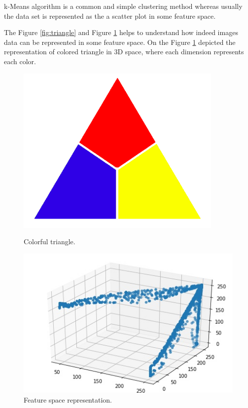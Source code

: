 k-Means algorithm is a common and simple clustering method whereas usually the data set is represented as the a scatter plot in some feature space.

The Figure \ref{fig:triangle} and Figure \ref{fig:clustering} helps to understand how indeed images data can be represented in some feature space. On the Figure  \ref{fig:clustering} depicted the representation of colored triangle in 3D space, where each dimension represents each color.

\begin{figure}[h]
    \centering
    \begin{minipage}[b]{0.4\textwidth}
    \includegraphics[width=\textwidth]{images/k_mean_triangle.png}
    \caption{Colorful triangle.}
    \label{fig:triangle}
    \end{minipage}
    \hfill
    \begin{minipage}[b]{0.4\textwidth}
    \includegraphics[width=\textwidth]{images/k_mean_triangle_clustered.jpg}
    \caption{Feature space representation.}
    \label{fig:clustering}
    \end{minipage}
\end{figure}


